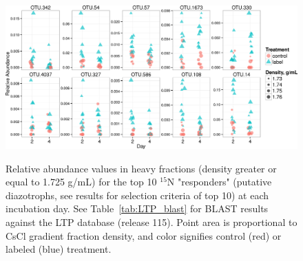\begin{figure}[H]
  \centering
    \caption{Relative abundance values in heavy fractions (density greater or
    equal to 1.725 g/mL) for the top 10 $^{15}$N "responders" (putative
    diazotrophs, see results for selection criteria of top 10) at each
    incubation day. See Table~\ref{tab:LTP_blast} for BLAST results against 
    the LTP database (release 115). Point area is proportional to CsCl gradient
    fraction density, and color signifies control (red) or labeled (blue)
    treatment.}
    \includegraphics[width=1.0\textwidth]{figures/scatter_heavy_topN2/scatter_heavy_topN.png}
  \label{fig:scatter_heavy}
\end{figure}

